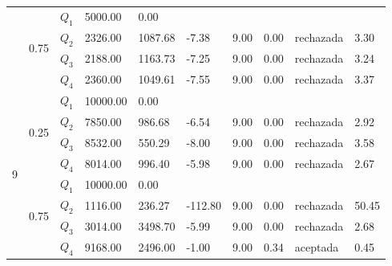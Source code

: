 \begin{table}[]
\begin{tabular}{|l|l|l|l|l|l|l|l|l|l|}
 & \multirow{4}{*}{0.75} & $Q_1$ & 5000.00 & 0.00 & \multicolumn{5}{l|}{} \\ \cline{3-10} 
 &  & $Q_2$ & 2326.00 & 1087.68 & -7.38 & 9.00 & 0.00 & rechazada & 3.30 \\ \cline{3-10} 
 &  & $Q_3$ & 2188.00 & 1163.73 & -7.25 & 9.00 & 0.00 & rechazada & 3.24 \\ \cline{3-10} 
 &  & $Q_4$ & 2360.00 & 1049.61 & -7.55 & 9.00 & 0.00 & rechazada & 3.37 \\ \hline
\multirow{8}{*}{9} & \multirow{4}{*}{0.25} & $Q_1$ & 10000.00 & 0.00 & \multicolumn{5}{l|}{} \\ \cline{3-10} 
 &  & $Q_2$ & 7850.00 & 986.68 & -6.54 & 9.00 & 0.00 & rechazada & 2.92 \\ \cline{3-10} 
 &  & $Q_3$ & 8532.00 & 550.29 & -8.00 & 9.00 & 0.00 & rechazada & 3.58 \\ \cline{3-10} 
 &  & $Q_4$ & 8014.00 & 996.40 & -5.98 & 9.00 & 0.00 & rechazada & 2.67 \\ \cline{2-10} 
 & \multirow{4}{*}{0.75} & $Q_1$ & 10000.00 & 0.00 & \multicolumn{5}{l|}{} \\ \cline{3-10} 
 &  & $Q_2$ & 1116.00 & 236.27 & -112.80 & 9.00 & 0.00 & rechazada & 50.45 \\ \cline{3-10} 
 &  & $Q_3$ & 3014.00 & 3498.70 & -5.99 & 9.00 & 0.00 & rechazada & 2.68 \\ \cline{3-10} 
 &  & $Q_4$ & 9168.00 & 2496.00 & -1.00 & 9.00 & 0.34 & aceptada & 0.45 \\ \hline
\end{tabular}
\end{table}


